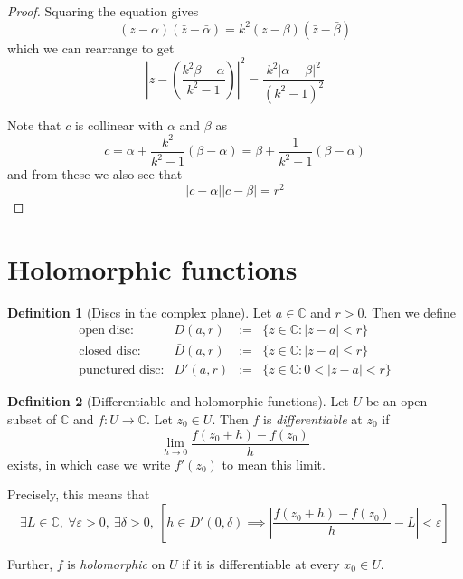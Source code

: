 \documentclass[10pt,fleqn]{article}
\newcommand{\comps}{\mathbb{C}}
\newcommand{\eps}{\varepsilon}
\theoremstyle{definition} \newtheorem{defn}{Definition}[section]
\theoremstyle{plain}      \newtheorem{thm}[defn]{Theorem}
\theoremstyle{definition} \newtheorem{prop}[defn]{Proposition}
\theoremstyle{plain}      \newtheorem{lem}[defn]{Lemma}
\theoremstyle{definition} \newtheorem{cor}[defn]{Corollary}
\theoremstyle{definition} \newtheorem{ex}[defn]{Example}
\theoremstyle{definition} \newtheorem{rem}[defn]{Remark}
\begin{document}
\begin{proof}
    Squaring the equation gives
    \[
        (z-\alpha)(\bar{z}-\bar{\alpha})=
        k^2(z-\beta)(\bar{z}-\bar{\beta})
    \]
    which we can rearrange to get
    \[
        \left|z-\left(\frac{k^2\beta-\alpha}{k^2-1}\right)\right|^2=
        \frac{k^2|\alpha-\beta|^2}{(k^2-1)^2}
    \]

    Note that $c$ is collinear with $\alpha$ and $\beta$ as
    \[
        c=
        \alpha+\frac{k^2}{k^2-1}(\beta-\alpha)=
        \beta+\frac{1}{k^2-1}(\beta-\alpha)
    \]
    and from these we also see that
    \[
        |c-\alpha||c-\beta|=r^2
    \]
\end{proof}


\section{Holomorphic functions}

\begin{defn}[Discs in the complex plane]
    Let $a\in\comps$ and $r>0$.
    Then we define
    \begin{equation}
        \begin{array}{rrcl}
            \text{open disc:} & D(a,r) & := & \{z\in\comps \colon |z-a|<r\}\\
            \text{closed disc:} & \bar{D}(a,r) & := & \{z\in\comps \colon |z-a|\leq r\}\\
            \text{punctured disc:} & D'(a,r) & := & \{z\in\comps \colon 0<|z-a|<r\}
        \end{array}
    \end{equation}
\end{defn}

\begin{defn}[Differentiable and holomorphic functions]
    Let $U$ be an open subset of $\comps$ and $f:U\to\comps$.
    Let $z_0\in U$.
    Then $f$ is \emph{differentiable} at $z_0$ if
    \begin{equation}
        \lim_{h\to0} \frac{f(z_0+h)-f(z_0)}{h}
    \end{equation}
    exists, in which case we write $f'(z_0)$ to mean this limit.

    Precisely, this means that
    \[
        \exists L\in\comps,~
        \forall\eps>0,~
        \exists\delta>0,~
        \left[h\in D'(0,\delta)\implies\left|\frac{f(z_0+h)-f(z_0)}{h}-L\right|<\eps\right]
    \]

    Further, $f$ is \emph{holomorphic} on $U$ if it is differentiable at every $x_0\in U$.
\end{defn}
\end{document}
